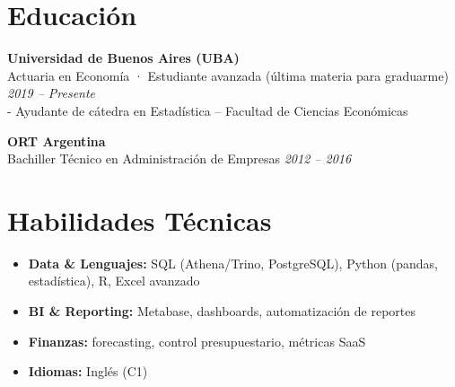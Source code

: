\documentclass[10pt, letterpaper]{article}
\begin{document}
\section*{Educación}

\textbf{Universidad de Buenos Aires (UBA)} \\
Actuaria en Economía · Estudiante avanzada (última materia para graduarme) \hfill \textit{2019 – Presente} \\
- Ayudante de cátedra en Estadística – Facultad de Ciencias Económicas

\vspace{0.1cm}

\textbf{ORT Argentina} \\
Bachiller Técnico en Administración de Empresas \hfill \textit{2012 – 2016}

\section*{Habilidades Técnicas}
\begin{itemize}
    \item \textbf{Data \& Lenguajes:} SQL (Athena/Trino, PostgreSQL), Python (pandas, estadística), R, Excel avanzado
    \item \textbf{BI \& Reporting:} Metabase, dashboards, automatización de reportes
    \item \textbf{Finanzas:} forecasting, control presupuestario, métricas SaaS
    \item \textbf{Idiomas:} Inglés (C1)
\end{itemize}
\end{document}
